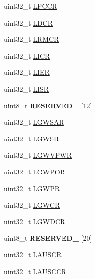\begin{DoxyCompactItemize}
\item 
uint32\+\_\+t \hyperlink{struct_l_c_d_c___mem_map_a76b526a80deb41b702d98a8de996b9a6}{L\+P\+C\+C\+R}
\item 
uint32\+\_\+t \hyperlink{struct_l_c_d_c___mem_map_a681d9ac7348e7f13c1211acce5621ce8}{L\+D\+C\+R}
\item 
uint32\+\_\+t \hyperlink{struct_l_c_d_c___mem_map_af3fc91dbd55df2dea9e83efe76f4d09d}{L\+R\+M\+C\+R}
\item 
uint32\+\_\+t \hyperlink{struct_l_c_d_c___mem_map_a8ea08c18d8bfde4540eaf4e11039837e}{L\+I\+C\+R}
\item 
uint32\+\_\+t \hyperlink{struct_l_c_d_c___mem_map_a602f30df3465d79b420243aaf1d51030}{L\+I\+E\+R}
\item 
uint32\+\_\+t \hyperlink{struct_l_c_d_c___mem_map_a567a030894ef2b7cf2c604d85946f3d4}{L\+I\+S\+R}
\item 
\hypertarget{struct_l_c_d_c___mem_map_af35faae8ae74a553ecf12a4fee0e2b77}{}uint8\+\_\+t {\bfseries R\+E\+S\+E\+R\+V\+E\+D\+\_} \mbox{[}12\mbox{]}\label{struct_l_c_d_c___mem_map_af35faae8ae74a553ecf12a4fee0e2b77}

\item 
uint32\+\_\+t \hyperlink{struct_l_c_d_c___mem_map_a31fb3217bf9eb1ecda85e0c2769c955d}{L\+G\+W\+S\+A\+R}
\item 
uint32\+\_\+t \hyperlink{struct_l_c_d_c___mem_map_a3866d5fe438c9aeca7f50a30148aaee9}{L\+G\+W\+S\+R}
\item 
uint32\+\_\+t \hyperlink{struct_l_c_d_c___mem_map_a111052a9f42adf314c795dd509c8b740}{L\+G\+W\+V\+P\+W\+R}
\item 
uint32\+\_\+t \hyperlink{struct_l_c_d_c___mem_map_af8ab91fa9f984a56dfa54a55f0fc90e7}{L\+G\+W\+P\+O\+R}
\item 
uint32\+\_\+t \hyperlink{struct_l_c_d_c___mem_map_a8f4192a93512b0a04c71bd2f8d92590f}{L\+G\+W\+P\+R}
\item 
uint32\+\_\+t \hyperlink{struct_l_c_d_c___mem_map_aa76ae1b0e32e1bd9459d642326549adf}{L\+G\+W\+C\+R}
\item 
uint32\+\_\+t \hyperlink{struct_l_c_d_c___mem_map_aef253853dccb165217b00da5fbe3b95f}{L\+G\+W\+D\+C\+R}
\item 
\hypertarget{struct_l_c_d_c___mem_map_ad9a0c44fec02be39f7d7c06f5997f976}{}uint8\+\_\+t {\bfseries R\+E\+S\+E\+R\+V\+E\+D\+\_} \mbox{[}20\mbox{]}\label{struct_l_c_d_c___mem_map_ad9a0c44fec02be39f7d7c06f5997f976}

\item 
uint32\+\_\+t \hyperlink{struct_l_c_d_c___mem_map_a4554fe80ffc64089e17a03de67cb47a1}{L\+A\+U\+S\+C\+R}
\item 
uint32\+\_\+t \hyperlink{struct_l_c_d_c___mem_map_affa1e28918315f44e2105aead9e695bc}{L\+A\+U\+S\+C\+C\+R}
\end{DoxyCompactItemize}


